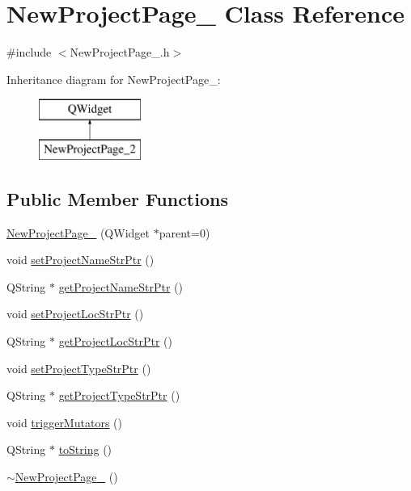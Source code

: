 \hypertarget{class_new_project_page__2}{\section{New\-Project\-Page\-\_ Class Reference}
\label{class_new_project_page__2}
}


{\ttfamily \#include $<$New\-Project\-Page\-\_.\-h$>$}

Inheritance diagram for New\-Project\-Page\-\_\-:\begin{figure}[H]
\begin{center}
\leavevmode
\includegraphics[height=2.000000cm]{class_new_project_page__2}
\end{center}
\end{figure}
\subsection*{Public Member Functions}
\begin{DoxyCompactItemize}
\item 
\hyperlink{class_new_project_page__2_a3091d785da72b2f9f43a82ed362305d1}{New\-Project\-Page\-\_} (Q\-Widget $\ast$parent=0)
\item 
void \hyperlink{class_new_project_page__2_a542d8acd5d97a5541c772a5ca7010c8c}{set\-Project\-Name\-Str\-Ptr} ()
\item 
Q\-String $\ast$ \hyperlink{class_new_project_page__2_acd99862f523b3986d39ea57a9a521aec}{get\-Project\-Name\-Str\-Ptr} ()
\item 
void \hyperlink{class_new_project_page__2_aa1ce052f5e700173eee0f73352e0d926}{set\-Project\-Loc\-Str\-Ptr} ()
\item 
Q\-String $\ast$ \hyperlink{class_new_project_page__2_a5b414441b86e09c1f3e35612a5f210ff}{get\-Project\-Loc\-Str\-Ptr} ()
\item 
void \hyperlink{class_new_project_page__2_a5c03c4b42d0749763cfb0666550a5fba}{set\-Project\-Type\-Str\-Ptr} ()
\item 
Q\-String $\ast$ \hyperlink{class_new_project_page__2_a3ddcd41d933c5f8cf3c6040122ee2d0e}{get\-Project\-Type\-Str\-Ptr} ()
\item 
void \hyperlink{class_new_project_page__2_aedf2995005e1d3e376d34f83a2b064a4}{trigger\-Mutators} ()
\item 
Q\-String $\ast$ \hyperlink{class_new_project_page__2_a57590dbeb6504e2c6aef8f5b4243672c}{to\-String} ()
\item 
\hyperlink{class_new_project_page__2_a4d76fcc79e976b428825449c45156ed5}{$\sim$\-New\-Project\-Page\-\_} ()
\end{DoxyCompactItemize}

